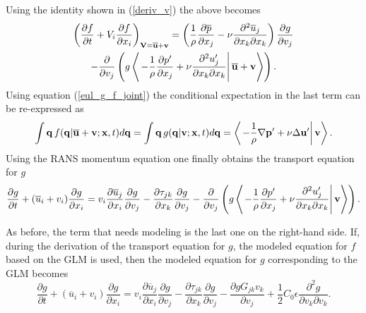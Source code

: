\documentclass[oneside,a4paper,11pt]{report}
\newcommand{\pavg}{\overline{p}}
\newcommand{\uavg}{\overline{u}}
\newcommand{\pfluc}{p'}
\newcommand{\ufluc}{u'}
\newcommand{\rs}{\tau}          %
\begin{document}
Using the identity shown in (\ref{deriv_v}) the above becomes
\begin{multline}
\left ( \frac{\partial f}{\partial t} + V_i \frac{\partial f}{\partial x_i} \right )_{\Vvec = \overline{\uvec} + \vvec} = \left ( \frac{1}{\rho} \frac{\partial \pavg}{\partial x_j} -\nu \frac{\partial^2 \uavg_j}{\partial x_k \partial x_k} \right ) \frac{\partial g}{\partial v_j} \\
- \frac{\partial}{\partial v_j} \left ( g \left < \left . - \frac{1}{\rho} \frac{\partial \pfluc}{\partial x_j} +  \nu \frac{\partial ^2 \ufluc_j}{\partial x_k \partial x_k} \right | \overline{\uvec} + \vvec \right > \right ). \end{multline}
Using equation (\ref{eul_g_f_joint}) the conditional expectation in the last term can be re-expressed as
\begin{equation}
\int \mathbf{q}\, f(\mathbf{q} | \overline{\mathbf{u}} + \mathbf{v}; \mathbf{x}, t) d\mathbf{q} = \int \mathbf{q}\, g(\mathbf{q} | \mathbf{v}; \mathbf{x}, t) d\mathbf{q} = \left < \left . - \frac{1}{\rho} \nabla \mathbf{p}' +  \nu \Delta \mathbf{u}' \right | \mathbf{v} \right >.
\end{equation}
Using the RANS momentum equation one finally obtains the transport equation for $g$
\begin{equation}
\frac{\partial g}{\partial t} + ( \uavg_i + v_i ) \frac{\partial g}{\partial x_i} = v_i \frac{\partial \uavg_j}{\partial x_i} \frac{\partial g}{\partial v_j} - \frac{\partial \rs_{jk}}{\partial x_k} \frac{\partial g}{\partial v_j} - \frac{\partial}{\partial v_j} \left ( g \left < \left . - \frac{1}{\rho} \frac{\partial \pfluc}{\partial x_j} +  \nu \frac{\partial ^2 \ufluc_j}{\partial x_k \partial x_k} \right | \vvec \right > \right ).
\end{equation}

As before, the term that needs modeling is the last one on the right-hand side. If, during the derivation of the transport equation for $g$, the modeled equation for $f$ based on the GLM is used, then the modeled equation for $g$ corresponding to the GLM becomes
\begin{equation}
\frac{\partial g}{\partial t} + ( \uavg_i + v_i ) \frac{\partial g}{\partial x_i} = v_i \frac{\partial \uavg_j}{\partial x_i} \frac{\partial g}{\partial v_j} - \frac{\partial \rs_{jk}}{\partial x_k} \frac{\partial g}{\partial v_j} - \frac{\partial g G_{jk} v_k}{\partial v_j}  + \frac{1}{2} C_0 \epsilon \frac{\partial^2 g}{\partial v_k \partial v_k}.
\end{equation}
\end{document}
